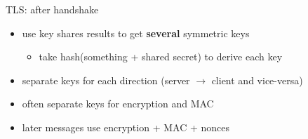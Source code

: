 \begin{frame}{TLS: after handshake}
    \begin{itemize}
    \item use key shares results to get \textbf{several} symmetric keys
        \begin{itemize}
        \item take hash(something + shared secret) to derive each key
        \end{itemize}
    \item separate keys for each direction (server $\rightarrow$ client and vice-versa)
    \item often separate keys for encryption and MAC
    \vspace{.5cm}
    \item later messages use encryption + MAC + nonces
    \end{itemize}
\end{frame}
